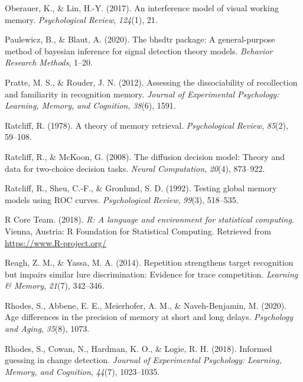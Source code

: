 \documentclass[
  english,
  ,man,floatsintext]{apa6}
\begin{document}
\leavevmode\hypertarget{ref-oberauer2017interference}{}%
Oberauer, K., \& Lin, H.-Y. (2017). An interference model of visual working memory. \emph{Psychological Review}, \emph{124}(1), 21.

\leavevmode\hypertarget{ref-paulewicz2020bhsdtr}{}%
Paulewicz, B., \& Blaut, A. (2020). The bhsdtr package: A general-purpose method of bayesian inference for signal detection theory models. \emph{Behavior Research Methods}, 1--20.

\leavevmode\hypertarget{ref-pratte2012assessing}{}%
Pratte, M. S., \& Rouder, J. N. (2012). Assessing the dissociability of recollection and familiarity in recognition memory. \emph{Journal of Experimental Psychology: Learning, Memory, and Cognition}, \emph{38}(6), 1591.

\leavevmode\hypertarget{ref-Ratcliff1978}{}%
Ratcliff, R. (1978). A theory of memory retrieval. \emph{Psychological Review}, \emph{85}(2), 59--108.

\leavevmode\hypertarget{ref-ratcliff2008diffusion}{}%
Ratcliff, R., \& McKoon, G. (2008). The diffusion decision model: Theory and data for two-choice decision tasks. \emph{Neural Computation}, \emph{20}(4), 873--922.

\leavevmode\hypertarget{ref-RatcliffEtAl1992}{}%
Ratcliff, R., Sheu, C.-F., \& Gronlund, S. D. (1992). Testing global memory models using ROC curves. \emph{Psychological Review}, \emph{99}(3), 518--535.

\leavevmode\hypertarget{ref-rteam}{}%
R Core Team. (2018). \emph{R: A language and environment for statistical computing}. Vienna, Austria: R Foundation for Statistical Computing. Retrieved from \url{https://www.R-project.org/}

\leavevmode\hypertarget{ref-ReaghAndYassa2014}{}%
Reagh, Z. M., \& Yassa, M. A. (2014). Repetition strengthens target recognition but impairs similar lure discrimination: Evidence for trace competition. \emph{Learning \& Memory}, \emph{21}(7), 342--346.

\leavevmode\hypertarget{ref-rhodes2020age}{}%
Rhodes, S., Abbene, E. E., Meierhofer, A. M., \& Naveh-Benjamin, M. (2020). Age differences in the precision of memory at short and long delays. \emph{Psychology and Aging}, \emph{35}(8), 1073.

\leavevmode\hypertarget{ref-RhodesEtAl2018}{}%
Rhodes, S., Cowan, N., Hardman, K. O., \& Logie, R. H. (2018). Informed guessing in change detection. \emph{Journal of Experimental Psychology: Learning, Memory, and Cognition}, \emph{44}(7), 1023--1035.
\end{document}
